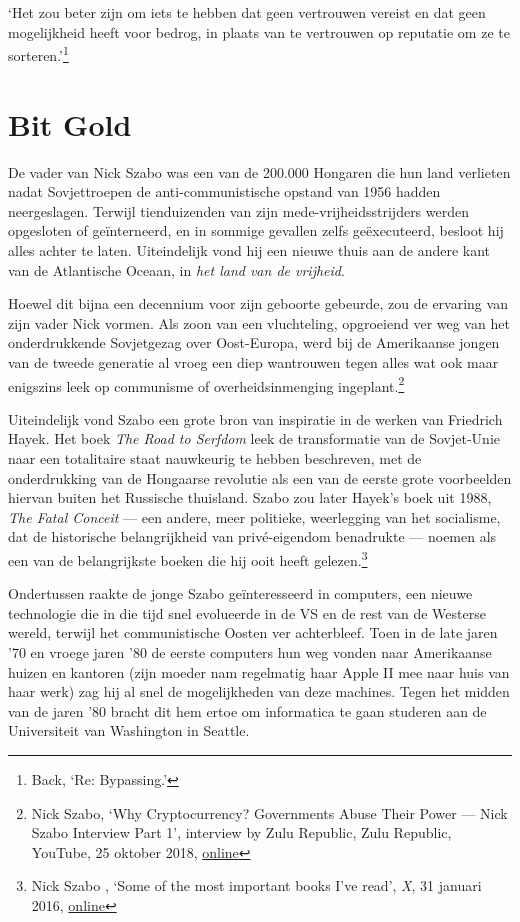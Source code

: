 \documentclass[
  a5paper,
  smalldemyvopaper,11pt,twoside,onecolumn,openright,extrafontsizes]{memoir}
\begin{document}
`Het zou beter zijn om iets te hebben dat geen vertrouwen vereist en dat
geen mogelijkheid heeft voor bedrog, in plaats van te vertrouwen op
reputatie om ze te sorteren.'\footnote{Back, `Re: Bypassing.'}

\chapter{Bit Gold}\label{bit-gold}

De vader van Nick Szabo was een van de 200.000 Hongaren die hun land
verlieten nadat Sovjettroepen de anti-communistische opstand van 1956
hadden neergeslagen. Terwijl tienduizenden van zijn
mede-vrijheidsstrijders werden opgesloten of geïnterneerd, en in sommige
gevallen zelfs geëxecuteerd, besloot hij alles achter te laten.
Uiteindelijk vond hij een nieuwe thuis aan de andere kant van de
Atlantische Oceaan, in \emph{het land van de vrijheid}.

Hoewel dit bijna een decennium voor zijn geboorte gebeurde, zou de
ervaring van zijn vader Nick vormen. Als zoon van een vluchteling,
opgroeiend ver weg van het onderdrukkende Sovjetgezag over Oost-Europa,
werd bij de Amerikaanse jongen van de tweede generatie al vroeg een diep
wantrouwen tegen alles wat ook maar enigszins leek op communisme of
overheidsinmenging ingeplant.\footnote{Nick Szabo, `Why Cryptocurrency?
  Governments Abuse Their Power --- Nick Szabo Interview Part 1',
  interview by Zulu Republic, Zulu Republic, YouTube, 25 oktober 2018,
  \href{https://www.youtube.com/watch?v=LZw4LNLYUgc}{online}}

Uiteindelijk vond Szabo een grote bron van inspiratie in de werken van
Friedrich Hayek. Het boek \emph{The Road to Serfdom} leek de
transformatie van de Sovjet-Unie naar een totalitaire staat nauwkeurig
te hebben beschreven, met de onderdrukking van de Hongaarse revolutie
als een van de eerste grote voorbeelden hiervan buiten het Russische
thuisland. Szabo zou later Hayek's boek uit 1988, \emph{The Fatal
Conceit} --- een andere, meer politieke, weerlegging van het socialisme,
dat de historische belangrijkheid van privé-eigendom benadrukte ---
noemen als een van de belangrijkste boeken die hij ooit heeft
gelezen.\footnote{Nick Szabo , `Some of the most important books I've
  read', \emph{X}, 31 januari 2016,
  \href{https://x.com/NickSzabo4/status/693682157525401601}{online}}

Ondertussen raakte de jonge Szabo geïnteresseerd in computers, een
nieuwe technologie die in die tijd snel evolueerde in de VS en de rest
van de Westerse wereld, terwijl het communistische Oosten ver
achterbleef. Toen in de late jaren '70 en vroege jaren '80 de eerste
computers hun weg vonden naar Amerikaanse huizen en kantoren (zijn
moeder nam regelmatig haar Apple II mee naar huis van haar werk) zag hij
al snel de mogelijkheden van deze machines. Tegen het midden van de
jaren '80 bracht dit hem ertoe om informatica te gaan studeren aan de
Universiteit van Washington in Seattle.
\end{document}
